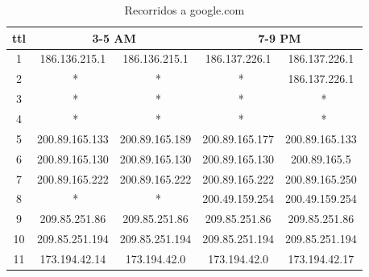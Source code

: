 \documentclass[a4paper]{article}
\begin{document}
 \begin{table}[!htb]
 	\begin{center}
 	\begin{tabular}{|c|c|c|c|c|}
 	  \hline
 	  ttl & \multicolumn{2}{|c|}{3-5 AM} & \multicolumn{2}{|c|}{7-9 PM} \\ \hline
	  1 & 186.136.215.1 & 186.136.215.1 & 186.137.226.1 & 186.137.226.1 \\ \hline
	  2 &  \ * &  \ * &  \ * & 186.137.226.1\\ \hline
	  3 &  \ * &  \ * &  \ * &  \ * \\ \hline
	  4 &  \ * &  \ * &  \ * &  \ * \\ \hline
	  5 & 200.89.165.133 & 200.89.165.189 & 200.89.165.177 & 200.89.165.133 \\ \hline
	  6 & 200.89.165.130 & 200.89.165.130 & 200.89.165.130 & 200.89.165.5 \\ \hline
	  7 & 200.89.165.222 & 200.89.165.222 & 200.89.165.222 & 200.89.165.250 \\ \hline
	  8 &  \ *  &  \ *  & 200.49.159.254 & 200.49.159.254 \\ \hline
	  9 & 209.85.251.86 & 209.85.251.86 & 209.85.251.86 & 209.85.251.86 \\ \hline
	  10 & 209.85.251.194 & 209.85.251.194 & 209.85.251.194 & 209.85.251.194 \\ \hline
	  11 & 173.194.42.14 & 173.194.42.0 & 173.194.42.0 & 173.194.42.17 \\ \hline

 	 \end{tabular}   
 	 \vspace{0pt}
 	 \caption{Recorridos a google.com}
 	\end{center}
 	\label{tab:google.com}
 \end{table}
 
\end{document}

